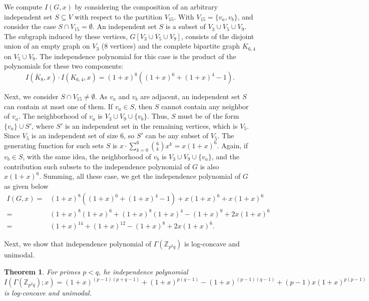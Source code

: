\documentclass[12pt,twoside]{article}
\newtheorem{theorem}{Theorem}[section]
\begin{document}
We compute $I(G,x)$ by considering the composition of an arbitrary independent set $S \subseteq V$ with respect to the partition $V_{15}$. With $V_{15}=\{v_a, v_b\}$, and consider the case $S \cap V_{15} = \emptyset$. 
An independent set $S$ is a subset of $V_3 \cup V_5 \cup V_9$. The subgraph induced by these vertices, $G[V_3 \cup V_5 \cup V_9]$, consists of the disjoint union of an empty graph on $V_3$ (8 vertices) and the complete bipartite graph $K_{6,4}$ on $V_5 \cup V_9$. The independence polynomial for this case is the product of the polynomials for these two components:
$$I(\overline{K}_8, x) \cdot I(K_{6,4}, x) = (1+x)^8 \left((1+x)^6 + (1+x)^4 - 1\right).$$

Next, we consider $S \cap V_{15} \neq \emptyset$. As $v_a$ and $v_b$ are adjacent, an independent set $S$ can contain at most one of them.
If $v_a \in S$, then $S$ cannot contain any neighbor of $v_a$. The neighborhood of $v_a$ is $V_3 \cup V_9 \cup \{v_b\}$. Thus, $S$ must be of the form $\{v_a\} \cup S'$, where $S'$ is an independent set in the remaining vertices, which is $V_5$. Since $V_5$ is an independent set of size $6$, so $S'$ can be any subset of $V_5$. The generating function for such sets $S$ is $x \cdot \sum_{k=0}^6 \binom{6}{k}x^k = x(1+x)^6$.
Again, if $v_b \in S$, with the same idea, the neighborhood of $v_b$ is $ V_3 \cup V_9 \cup \{v_a\}$, and the contribution such subsets to the independence polynomial of $G$ is also $x(1+x)^6$. Summing, all these case, we get the independence polynomial of $G$ as given below
\begin{align*}
	I(G,x) =& (1+x)^8 \left((1+x)^6 + (1+x)^4 - 1\right)+ x(1+x)^6 + x(1+x)^6\\
	=& (1+x)^8 (1+x)^6 + (1+x)^8 (1+x)^4 - (1+x)^8 + 2x(1+x)^6\\
	=& (1+x)^{14} + (1+x)^{12} - (1+x)^8 + 2x(1+x)^6.
\end{align*}

Next, we show that independence polynomial of $\varGamma(\mathbb{Z}_{p^2q})$ is log-concave and unimodal.
\begin{theorem}
	For primes $p<q$, he independence polynomial
	$$
	I(\varGamma(\mathbb{Z}_{p^2q});x)
	=
	(1+x)^{(p-1)(p+q-1)}
	+
	(1+x)^{p(q-1)}
	-
	(1+x)^{(p-1)(q-1)}
	+
	(p-1)x(1+x)^{p(p-1)}
	$$
	is log-concave and  unimodal.
\end{theorem}
\end{document}
